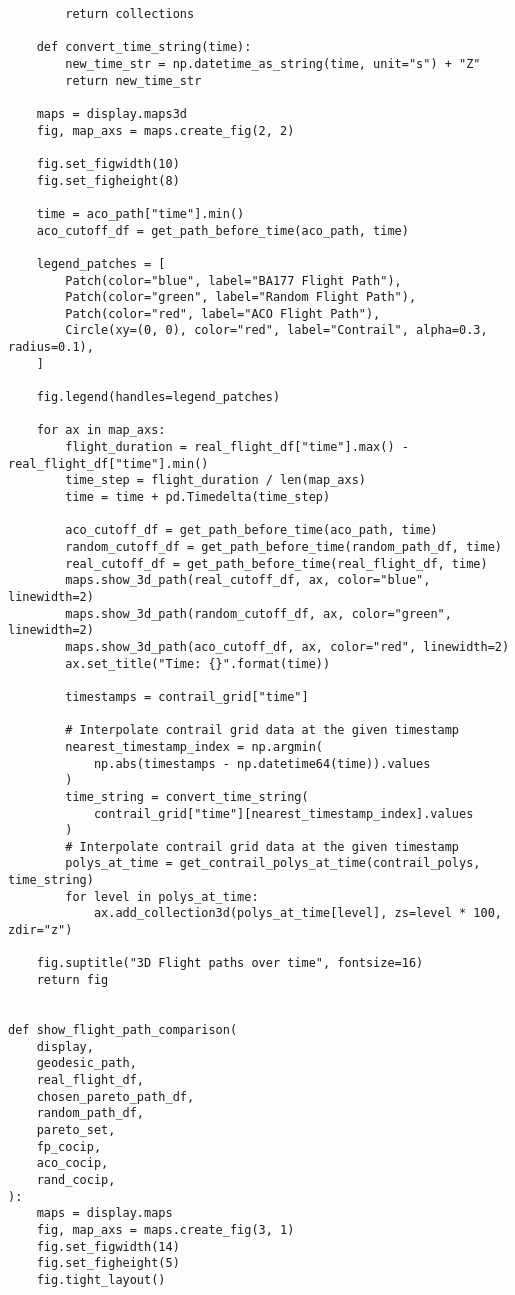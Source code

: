 \begin{verbatim}
        return collections

    def convert_time_string(time):
        new_time_str = np.datetime_as_string(time, unit="s") + "Z"
        return new_time_str

    maps = display.maps3d
    fig, map_axs = maps.create_fig(2, 2)

    fig.set_figwidth(10)
    fig.set_figheight(8)

    time = aco_path["time"].min()
    aco_cutoff_df = get_path_before_time(aco_path, time)

    legend_patches = [
        Patch(color="blue", label="BA177 Flight Path"),
        Patch(color="green", label="Random Flight Path"),
        Patch(color="red", label="ACO Flight Path"),
        Circle(xy=(0, 0), color="red", label="Contrail", alpha=0.3, radius=0.1),
    ]

    fig.legend(handles=legend_patches)

    for ax in map_axs:
        flight_duration = real_flight_df["time"].max() - real_flight_df["time"].min()
        time_step = flight_duration / len(map_axs)
        time = time + pd.Timedelta(time_step)

        aco_cutoff_df = get_path_before_time(aco_path, time)
        random_cutoff_df = get_path_before_time(random_path_df, time)
        real_cutoff_df = get_path_before_time(real_flight_df, time)
        maps.show_3d_path(real_cutoff_df, ax, color="blue", linewidth=2)
        maps.show_3d_path(random_cutoff_df, ax, color="green", linewidth=2)
        maps.show_3d_path(aco_cutoff_df, ax, color="red", linewidth=2)
        ax.set_title("Time: {}".format(time))

        timestamps = contrail_grid["time"]

        # Interpolate contrail grid data at the given timestamp
        nearest_timestamp_index = np.argmin(
            np.abs(timestamps - np.datetime64(time)).values
        )
        time_string = convert_time_string(
            contrail_grid["time"][nearest_timestamp_index].values
        )
        # Interpolate contrail grid data at the given timestamp
        polys_at_time = get_contrail_polys_at_time(contrail_polys, time_string)
        for level in polys_at_time:
            ax.add_collection3d(polys_at_time[level], zs=level * 100, zdir="z")

    fig.suptitle("3D Flight paths over time", fontsize=16)
    return fig


def show_flight_path_comparison(
    display,
    geodesic_path,
    real_flight_df,
    chosen_pareto_path_df,
    random_path_df,
    pareto_set,
    fp_cocip,
    aco_cocip,
    rand_cocip,
):
    maps = display.maps
    fig, map_axs = maps.create_fig(3, 1)
    fig.set_figwidth(14)
    fig.set_figheight(5)
    fig.tight_layout()


\end{verbatim}
